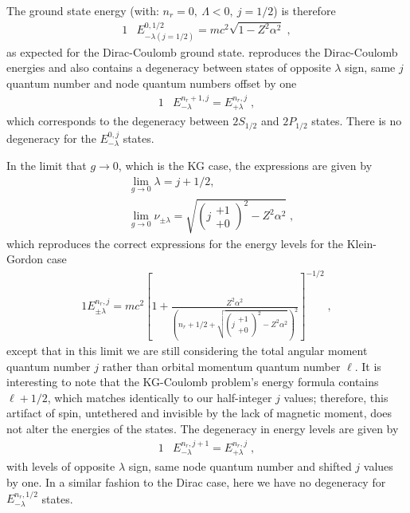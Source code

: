 The ground state energy (with: $n_{r}=0,\ \Lambda<0,\ j=1/2$) is therefore
\begin{alignat}{1}
\label{glimit07} &E^{0,1/2}_{-\lambda(j=1/2)}=mc^{2}\sqrt{1-Z^{2}\alpha^{2}}\;,\end{alignat}
as expected for the Dirac-Coulomb ground state.  reproduces the Dirac-Coulomb energies and also contains a degeneracy between states of opposite $\lambda$ sign, same $j$ quantum number and node quantum numbers offset by one
\begin{alignat}{1}
\label{glimit03} &E^{n_{r}+1,j}_{-\lambda}=E^{n_{r},j}_{+\lambda}\;,\end{alignat}
which corresponds to the degeneracy between $2S_{1/2}$ and $2P_{1/2}$ states. There is no degeneracy for the $E^{0,j}_{-\lambda}$ states. 

In the limit that $g\rightarrow 0$, which is the KG case, the expressions are given by
\begin{subequations}
\begin{alignat}{1}
\label{glimit04} &\lim_{g\rightarrow0}\lambda=j+1/2,\\
&\lim_{g\rightarrow0}\nu_{\pm\lambda}=\sqrt{\left(j\begin{smallmatrix} +1 \\ +0 \end{smallmatrix}\right)^{2}-Z^{2}\alpha^{2}}\;,
\end{alignat}
\end{subequations}
which reproduces the correct expressions for the energy levels for the Klein-Gordon case 
\begin{alignat}{1}
\label{glimit05} E_{\pm\lambda}^{n_{r},j}=mc^{2}\left[1+\displaystyle\frac{Z^{2}\alpha^{2}}{\left(n_{r}+1/2+\displaystyle\sqrt{\left(j\begin{smallmatrix} +1 \\ +0 \end{smallmatrix}\right)^{2}-Z^{2}\alpha^{2}}\right)^{2}}\right]^{-1/2}\;,
\end{alignat}
except that in this limit we are still considering the total angular moment quantum number $j$ rather than orbital momentum quantum number $\ell$. It is interesting to note that the KG-Coulomb problem's energy formula contains $\ell+1/2$, which matches identically to our half-integer $j$ values; therefore, this artifact of spin, untethered and invisible by the lack of magnetic moment, does not alter the energies of the states. The degeneracy in energy levels are given by 
\begin{alignat}{1}
\label{glimit06} &E^{n_{r},j+1}_{-\lambda}=E^{n_{r},j}_{+\lambda}\;,\end{alignat}
with levels of opposite $\lambda$ sign, same node quantum number and shifted $j$ values by one. In a similar fashion to the Dirac case, here we have no degeneracy for $E^{n_{r},1/2}_{-\lambda}$ states.

